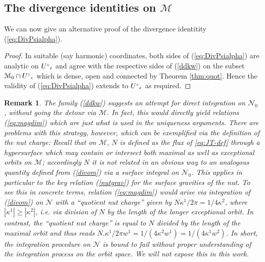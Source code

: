\documentclass[a4paper,11pt,reqno]{amsart}
\newcommand{\cM}{\mathcal{M}}
\newcommand{\cN}{\mathcal{N}}
\theoremstyle{plain}
\newtheorem{remark}[thm]{Remark}
\newcommand{\PM}[1]{{{#1}^{\hspace{-.5pt}\scaleto{\pm}{3.5pt}}}}
\numberwithin{equation}{section}
\newcommand{\eps}{\epsilon}
\begin{document}
\subsection{The divergence identities on $\cM$}

We can now give an alternative proof of the divergence identitity 
%
(\ref{eq:DivPsialpha}).
%

\begin{proof} 
 In suitable (say harmonic) coordinates, both sides  
 of 
 (\ref{eq:DivPsialpha}) are analytic on  
 $\PM{U}_\eps$ and agree with the respective sides of (\ref{ddkw}) on the  subset $\cM_0 \cap \PM{U}_\eps$ which is dense, open and connected  by Theorem \ref{thm:quot}. Hence the validity of (\ref{eq:DivPsialpha})
extends to $\PM{U}_\eps$ as required.
\end{proof}

\begin{remark}
\label{quotint}
The family (\ref{ddkw})  suggests an attempt for direct integration on $\cN_0$, without going the detour via $\cM$. 
In fact, this would directly yield relations (\ref{eq:magdim}) which are just what is used in the uniqueness arguments. 
There are  problems with this strategy, however, which can be exemplified via the definition  of the  nut charge: Recall that on $\cM$, $N$ is defined  as the flux of \eqref{eq:JT-def} through a hypersurface which may contain or intersect both maximal as well as  exceptional orbits  on $\cM$; accordingly $N$ it is not related in an obvious way to an analogous  quantity  defined from (\ref{divom}) via  a surface integral on $\cN_0$. This applies  in particular to the key 
 relation (\ref{nutgrav})  for the surface gravities of the nut. To see this in concrete terms,   relation (\ref{eq:magdim}) would arise  via integration of (\ref{divom}) on $\cN$ with a ``quotient nut charge''  given by   $N \kappa^1 /2\pi  = 1/4 \kappa^2 $, where $|\kappa^1| \geq |\kappa^2|$, i.e. via division of $N$  by the length of the \emph{longer exceptional}   orbit. In contrast, the  ``quotient nut charge'' \cite[Eq. (5.9]{gibbons:hawking:1979} is equal to  $N$ divided by the length of the \emph{maximal} orbit and thus reads
 $N . \kappa^1 /2\pi w^1 = 1/(4 \kappa^2  w^1) =  1/(4 \kappa^1 w^2)  $. 
 In short, the integration  procedure on $\cN$ is bound to fail without proper understanding of the integration process on the orbit space.
 We will not expose this in this work.
 
\end{remark}





%
\newcommand{\arxivref}[1]{\href{http://www.arxiv.org/abs/#1}{{arXiv:#1}}}
\newcommand{\prd}{Phys. Rev. D} 


\end{document}

